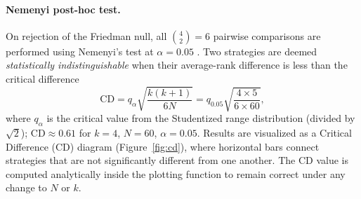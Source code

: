 \paragraph{Nemenyi post-hoc test.}
On rejection of the Friedman null, all $\binom{4}{2} = 6$ pairwise
comparisons are performed using Nemenyi's test at $\alpha = 0.05$
\citep{terpilowski2019scikit}.
Two strategies are deemed \emph{statistically indistinguishable} when
their average-rank difference is less than the critical difference
\[
  \mathrm{CD}
    = q_\alpha \sqrt{\frac{k(k+1)}{6N}}
    = q_{0.05}\sqrt{\frac{4 \times 5}{6 \times 60}},
\]
where $q_\alpha$ is the critical value from the Studentized range
distribution (divided by $\sqrt{2}$); $\mathrm{CD} \approx 0.61$ for
$k=4$, $N=60$, $\alpha=0.05$.
Results are visualized as a Critical Difference (CD) diagram
(Figure~\ref{fig:cd}), where horizontal bars connect strategies that
are not significantly different from one another.
The CD value is computed analytically inside the plotting function to
remain correct under any change to $N$ or $k$.
